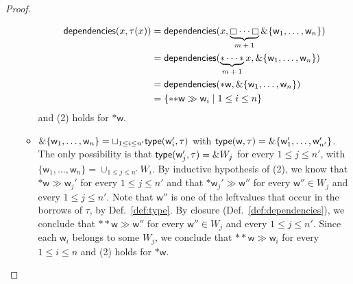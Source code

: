 \begin{proof}
\begin{itemize}
\begin{itemize}
\begin{align*}
        \mathsf{dependencies}(x,\tau(x))&=\mathsf{dependencies}(x,\underbrace{\boxempty\cdots\boxempty}_{\text{$m+1$}}\&\{\mathsf{w}_1,\ldots,\mathsf{w}_n\})\\
        &=\mathsf{dependencies}(\underbrace{\mathtt{*}\cdots\mathtt{*}}_{\text{$m+1$}}x,
        \&\{\mathsf{w}_1,\ldots,\mathsf{w}_n\})\\
        &=\mathsf{dependencies}(\mathtt{*}\mathsf{w},\&\{\mathsf{w}_1,\ldots,\mathsf{w}_n\})\\
        &=\{\mathtt{**}\mathsf{w}\gg\mathsf{w}_i\mid 1\le i\le n\}
      \end{align*}
      and (2) holds for $\mathtt{*}\mathsf{w}$.
    \item $\&\{\mathsf{w}_1,\ldots,\mathsf{w}_n\}=\sqcup_{1\le i\le n'}\mathsf{type}(\mathsf{w}_i',\tau)$
      with $\mathsf{type}(\mathsf{w},\tau)=\&\{\mathsf{w}'_1,\ldots,\mathsf{w}'_{n'}\}$.
      The only possibility is that $\mathsf{type}(\mathsf{w}_j',\tau)=\& W_j$ for every $1\le j\le n'$,
      with $\{\mathsf{w}_1,\ldots,\mathsf{w}_n\}=\cup_{1\le j\le n'}W_i$.
      By inductive hypothesis of (2), we know that
      $\mathtt{*}\mathsf{w}\gg\mathsf{w}_j'$ for every $1\le j\le n'$ and that
      $\mathtt{*}\mathsf{w}_j'\gg\mathsf{w}''$ for every $\mathsf{w}''\in W_j$ and
      every $1\le j\le n'$. Note that $\mathsf{w}''$ is one of the leftvalues that occur
      in the borrows of $\tau$, by Def.~\ref{def:type}.
      By closure (Def.~\ref{def:dependencies}), we conclude that
      $\mathtt{**}\mathsf{w}\gg\mathsf{w}''$ for every $\mathsf{w}''\in W_j$ and
      every $1\le j\le n'$. Since each $\mathsf{w}_i$ belongs to some $W_j$, we conclude that
      $\mathtt{**}\mathsf{w}\gg\mathsf{w}_i$ for every $1\le i\le n$ and (2) holds for $\mathtt{*}\mathsf{w}$.
    \end{itemize}
  \end{itemize}
\end{proof}

